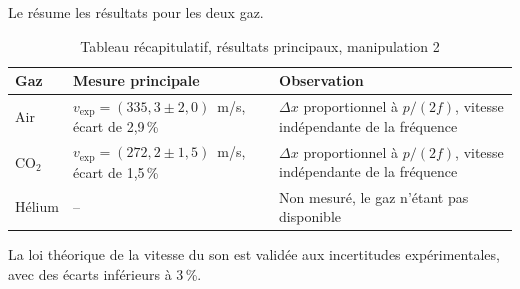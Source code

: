 Le  résume les résultats pour les deux gaz.

\begin{table}[H]
    \centering
    \begin{tabular}{l p{4.6cm} p{5.6cm}}
        \toprule
        Gaz & Mesure principale & Observation \\
        \midrule
        Air & $v_{\text{exp}} = (335{,}3 \pm 2{,}0)$~m/s, écart de 2,9\,\% & $\Delta x$ proportionnel à $p/(2f)$, vitesse indépendante de la fréquence \\
        CO$_2$ & $v_{\text{exp}} = (272{,}2 \pm 1{,}5)$~m/s, écart de 1,5\,\% & $\Delta x$ proportionnel à $p/(2f)$, vitesse indépendante de la fréquence \\
        Hélium & -- & Non mesuré, le gaz n'étant pas disponible \\
        \bottomrule
    \end{tabular}
    \caption{Tableau récapitulatif, résultats principaux, manipulation 2}
    \label{tab:resume-trombone}
\end{table}

La loi théorique de la vitesse du son est validée aux incertitudes expérimentales, avec des écarts inférieurs à 3\,\%.
